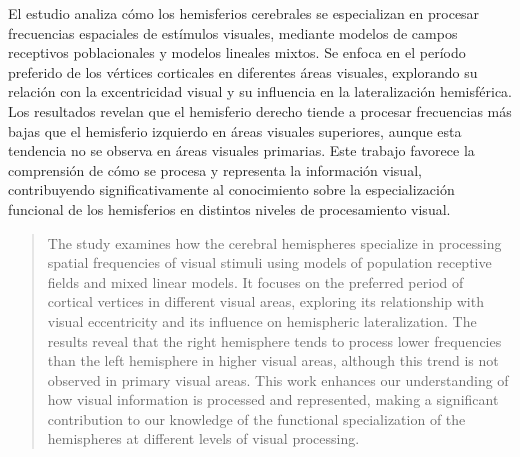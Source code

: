 \begin{resumen}
	El estudio analiza cómo los hemisferios cerebrales se especializan en procesar frecuencias espaciales de est\'imulos visuales, mediante modelos de campos receptivos poblacionales y modelos lineales mixtos. Se enfoca en el período preferido de los vértices corticales en diferentes áreas visuales, explorando su relación con la excentricidad visual y su influencia en la lateralización hemisférica. Los resultados revelan que el hemisferio derecho tiende a procesar frecuencias más bajas que el hemisferio izquierdo en áreas visuales superiores, aunque esta tendencia no se observa en áreas visuales primarias.  Este trabajo favorece la comprensión de cómo se procesa y representa la información visual, contribuyendo significativamente al conocimiento sobre la especialización funcional de los hemisferios en distintos niveles de procesamiento visual.
\end{resumen}

\begin{abstract}
	The study examines how the cerebral hemispheres specialize in processing spatial frequencies of visual stimuli using models of population receptive fields and mixed linear models. It focuses on the preferred period of cortical vertices in different visual areas, exploring its relationship with visual eccentricity and its influence on hemispheric lateralization. The results reveal that the right hemisphere tends to process lower frequencies than the left hemisphere in higher visual areas, although this trend is not observed in primary visual areas. This work enhances our understanding of how visual information is processed and represented, making a significant contribution to our knowledge of the functional specialization of the hemispheres at different levels of visual processing.
\end{abstract}
